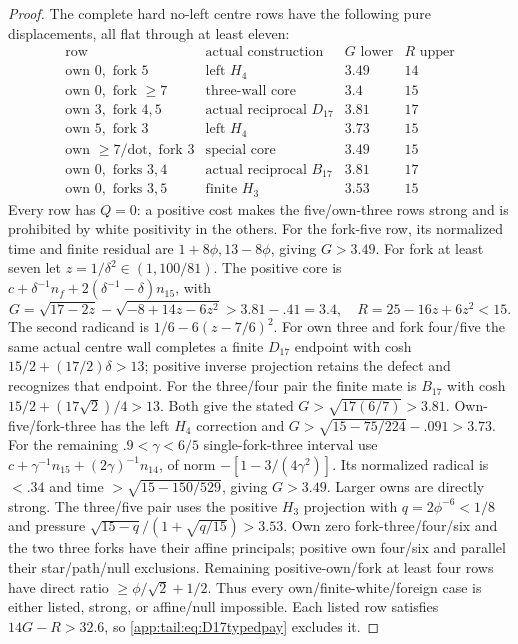 \documentclass[11pt]{article}
\theoremstyle{definition}
\theoremstyle{remark}
\begin{document}
\begin{proof}
The complete hard no-left centre rows have the following
pure displacements, all flat through at least eleven:
\[
\begin{array}{c|c|cc}
\text{row}&\text{actual construction}&G\text{ lower}&R\text{ upper}\\\hline
\text{own }0,\text{ fork }5&\text{left }H_4&3.49&14\\
\text{own }0,\text{ fork }\ge7&\text{three-wall core}&3.4&15\\
\text{own }3,\text{ fork }4,5&\text{actual reciprocal }D_{17}&3.81&17\\
\text{own }5,\text{ fork }3&\text{left }H_4&3.73&15\\
\text{own }\ge7/\text{dot},\text{ fork }3&\text{special core}&3.49&15\\
\text{own }0,\text{ forks }3,4&\text{actual reciprocal }B_{17}&3.81&17\\
\text{own }0,\text{ forks }3,5&\text{finite }H_3&3.53&15
\end{array}
\]
Every row has $Q=0$: a positive cost makes the five/own-three
rows strong and is prohibited by white positivity in the others.
For the fork-five row, its normalized time and finite residual
are $1+8\phi,13-8\phi$, giving $G>3.49$.
For fork at least seven let $z=1/\delta^2\in(1,100/81)$.
The positive core is
$c+\delta^{-1}n_f+2(\delta^{-1}-\delta)n_{15}$, with
\[
 G=\sqrt{17-2z}-\sqrt{-8+14z-6z^2}>3.81-.41=3.4,
 \quad R=25-16z+6z^2<15.
\]
The second radicand is $1/6-6(z-7/6)^2$.
For own three and fork four/five the same actual centre
wall completes a finite $D_{17}$ endpoint with cosh
$15/2+(17/2)\delta>13$; positive inverse projection retains
the defect and recognizes that endpoint.
For the three/four pair the finite mate is $B_{17}$ with
cosh $15/2+(17\sqrt2)/4>13$.
Both give the stated $G>\sqrt{17(6/7)}>3.81$.
Own-five/fork-three has the left $H_4$ correction and
$G>\sqrt{15-75/224}-.091>3.73$.
For the remaining $.9<\gamma<6/5$ single-fork-three interval
use $c+\gamma^{-1}n_{15}+(2\gamma)^{-1}n_{14}$,
of norm $-[1-3/(4\gamma^2)]$.
Its normalized radical is $<.34$ and time
$>\sqrt{15-150/529}$, giving $G>3.49$.
Larger owns are directly strong. The three/five pair uses the
positive $H_3$ projection with $q=2\phi^{-6}<1/8$ and
pressure $\sqrt{15-q}/(1+\sqrt{q/15})>3.53$.
Own zero fork-three/four/six and the two three forks have
their affine principals; positive own four/six and parallel
their star/path/null exclusions. Remaining positive-own/fork
at least four rows have direct ratio $\ge\phi/\sqrt2+1/2$.
Thus every own/finite-white/foreign case is either listed,
strong, or affine/null impossible.
Each listed row satisfies $14G-R>32.6$, so
\eqref{app:tail:eq:D17typedpay} excludes it.


\end{proof}
\end{document}
